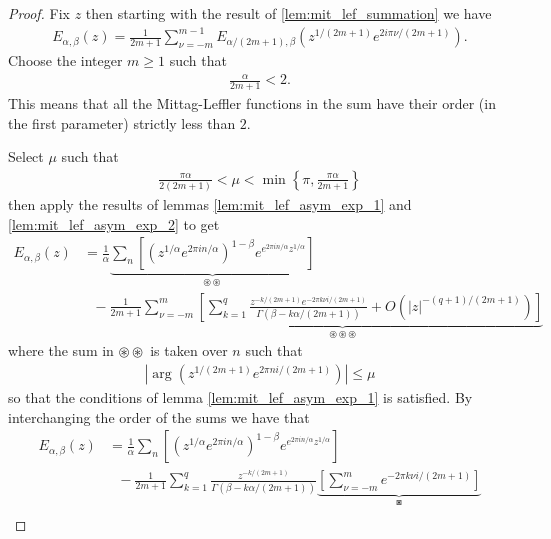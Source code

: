 \begin{proof}
    Fix $ z $ then starting with the result of \ref{lem:mit_lef_summation} we have 
    \begin{align}
        E_{\alpha, \beta}(z) = \frac{1}{2m+1} \sum_{\nu=-m}^{m-1} E_{\alpha / (2m+1), \beta}\left( z^{1/(2m+1)} e^{2i\pi\nu/(2m+1)}\right).
    \end{align}
    Choose the integer $ m \geq 1 $ such that 
    \begin{align}
        \frac{\alpha}{2m+1} < 2.
    \end{align}
    This means that all the Mittag-Leffler functions in the sum have their order (in the first parameter) strictly less than $ 2 $. 
    
    Select $ \mu $ such that 
    \begin{align}
        \frac{\pi \alpha}{2(2m+1)} < \mu < \min\left\{ \pi, \frac{\pi \alpha}{2m+1} \right\}
    \end{align}    
    then apply the results of 
    lemmas \ref{lem:mit_lef_asym_exp_1} and \ref{lem:mit_lef_asym_exp_2} to get 
    \begin{align}
        E_{\alpha, \beta}(z) &= \frac{1}{\alpha} \underbrace{\sum_{n} \left[ \left(z^{1 / \alpha} e^{2\pi i n / \alpha} \right)^{1-\beta} e^{e^{2\pi i n / \alpha}z^{1 / \alpha} }\right]}_{\circledast \circledast} \\ 
    & \ \ \ - \frac{1}{2m + 1} \underbrace{\sum_{\nu=-m}^m \left[ \sum_{k=1}^q \frac{z^{-k/(2m+1)}e^{-2\pi k \nu i / (2m + 1)}}{\Gamma(\beta - k\alpha / (2m + 1))} + O\left(|z|^{-(q+1)/(2m+1)}\right) \right]}_{\circledast\circledast\circledast}
    \end{align}
    where the sum in $ \circledast \circledast $ is taken over $ n $ such that
    \begin{align}
        \label{eq:mit_lef_asym_cond}
        \left| \arg\left( z^{1/(2m+1)}e^{2\pi n i / (2m + 1)} \right)\right| \leq \mu
    \end{align} 
    so that the conditions of lemma \ref{lem:mit_lef_asym_exp_1} is satisfied. 
    By interchanging the order of the sums we have that
    \begin{align}
        E_{\alpha, \beta}(z) &= \frac{1}{\alpha} \sum_{n} \left[ \left(z^{1 / \alpha} e^{2\pi i n / \alpha} \right)^{1-\beta} e^{e^{2\pi i n / \alpha}z^{1 / \alpha} }\right] \\ 
    & \ \ \ - \frac{1}{2m + 1} \sum_{k=1}^q \frac{z^{-k/(2m + 1)}}{\Gamma(\beta - k\alpha / (2m + 1))} \underbrace{\left[ \sum_{\nu = -m}^m e^{-2\pi k \nu i / (2m + 1)} \right]}_{\boxast} \\ 

\end{align}
\end{proof}

